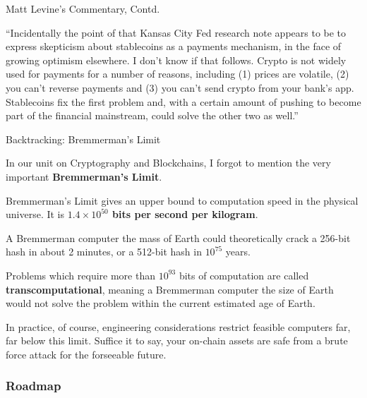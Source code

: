 \documentclass[]{beamer}
\begin{document}
\begin{frame}{Matt Levine's Commentary, Contd.}
    
``Incidentally the point of that Kansas City Fed research note appears to be to express skepticism about stablecoins as a payments mechanism, in the face of growing optimism elsewhere. I don’t know if that follows. Crypto is not widely used for payments for a number of reasons, including (1) prices are volatile, (2) you can’t reverse payments and (3) you can’t send crypto from your bank’s app. Stablecoins fix the first problem and, with a certain amount of pushing to become part of the financial mainstream, could solve the other two as well.''
    
\end{frame}


\begin{frame}{Backtracking: Bremmerman's Limit}

In our unit on Cryptography and Blockchains, I forgot to mention the very important \textbf{Bremmerman's Limit}. \\ \vfill 

Bremmerman's Limit gives an upper bound to computation speed in the physical universe. It is \textbf{$1.4\times 10^{50}$ bits per second per kilogram}. \\ \vfill 

A Bremmerman computer the mass of Earth could theoretically crack a 256-bit hash in about 2 minutes, or a 512-bit hash in $10^{75}$ years. \\ \vfill 

Problems which require more than $10^{93}$ bits of computation are called \textbf{transcomputational}, meaning a Bremmerman computer the size of Earth would not solve the problem within the current estimated age of Earth. \\ \vfill 

In practice, of course, engineering considerations restrict feasible computers far, far below this limit. Suffice it to say, your on-chain assets are safe from a brute force attack for the forseeable future. 
    
\end{frame}


\begin{frame}
\frametitle{Roadmap}
\tableofcontents
\end{frame}


\end{document}
